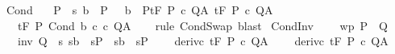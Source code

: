 \begin{isabellebody}
\isanewline
{}\isamarkupfalse%
\ Cond{\isacharprime}{\isacharcolon}\ \isanewline
\ \ {\isachardoublequoteopen}{\isasymlbrakk}P\ {\isasymsubseteq}\ {\isacharbraceleft}s{\isachardot}\ {\isacharparenleft}b\ {\isasymsubseteq}\ P{}{\isacharparenright}\ {\isasymand}\ {\isacharparenleft}{\isacharminus}\ b\ {\isasymsubseteq}\ P{}{\isacharparenright}{\isacharbraceright}{\isacharsemicolon}{\isasymGamma}{\isacharcomma}{\isasymTheta}{\isasymturnstile}\isactrlsub t\isactrlbsub {\isacharslash}F\isactrlesub \ P{}\ c{}\ Q{\isacharcomma}A{\isacharsemicolon}\ {\isasymGamma}{\isacharcomma}{\isasymTheta}{\isasymturnstile}\isactrlsub t\isactrlbsub {\isacharslash}F\isactrlesub \ P{}\ c{}\ Q{\isacharcomma}A{\isasymrbrakk}\isanewline
\ \ \ {\isasymLongrightarrow}\ \isanewline
\ \ \ {\isasymGamma}{\isacharcomma}{\isasymTheta}{\isasymturnstile}\isactrlsub t\isactrlbsub {\isacharslash}F\isactrlesub \ P\ {\isacharparenleft}Cond\ b\ c{}\ c{}{\isacharparenright}\ Q{\isacharcomma}A{\isachardoublequoteclose}\isanewline
%
\isadelimproof
\ \ %
\endisadelimproof
%
\isatagproof
{}\isamarkupfalse%
\ {\isacharparenleft}rule\ CondSwap{\isacharparenright}\ blast{\isacharplus}%
\endisatagproof
{\isafoldproof}%
%
\isadelimproof
\isanewline
%
\endisadelimproof
\isanewline
{}\isamarkupfalse%
\ CondInv{\isacharcolon}\ \isanewline
\ \ \ wp{\isacharcolon}\ {\isachardoublequoteopen}P\ {\isasymsubseteq}\ Q{\isachardoublequoteclose}\ \isanewline
\ \ \ inv{\isacharcolon}\ {\isachardoublequoteopen}Q\ {\isasymsubseteq}\ {\isacharbraceleft}s{\isachardot}\ {\isacharparenleft}s{\isasymin}b\ {\isasymlongrightarrow}\ s{\isasymin}P\ {\isasymand}\ {\isacharparenleft}s{\isasymnotin}b\ {\isasymlongrightarrow}\ s{\isasymin}P\ \isanewline
\ \ \ deriv{\isacharunderscore}c{}{\isacharcolon}\ {\isachardoublequoteopen}{\isasymGamma}{\isacharcomma}{\isasymTheta}{\isasymturnstile}\isactrlsub t\isactrlbsub {\isacharslash}F\isactrlesub \ P\ c\ Q{\isacharcomma}A{\isachardoublequoteclose}\ \isanewline
\ \ \ deriv{\isacharunderscore}c{}{\isacharcolon}\ {\isachardoublequoteopen}{\isasymGamma}{\isacharcomma}{\isasymTheta}{\isasymturnstile}\isactrlsub t\isactrlbsub {\isacharslash}F\isactrlesub \ P\ c\ Q{\isacharcomma}A{\isachardoublequoteclose}\isanewline

\end{isabellebody}
